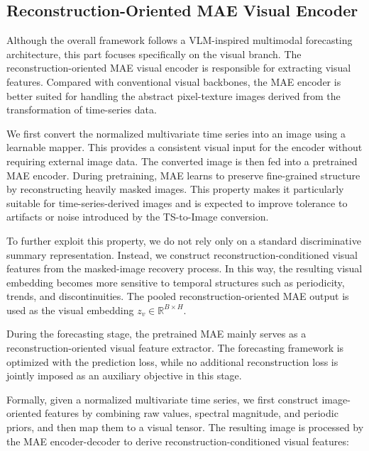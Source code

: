 \subsection{Reconstruction-Oriented MAE Visual Encoder}

Although the overall framework follows a VLM-inspired multimodal forecasting architecture, this part focuses specifically on the visual branch. The reconstruction-oriented MAE visual encoder is responsible for extracting visual features. Compared with conventional visual backbones, the MAE encoder is better suited for handling the abstract pixel-texture images derived from the transformation of time-series data.

We first convert the normalized multivariate time series into an image using a learnable mapper. This provides a consistent visual input for the encoder without requiring external image data. The converted image is then fed into a pretrained MAE encoder. During pretraining, MAE learns to preserve fine-grained structure by reconstructing heavily masked images. This property makes it particularly suitable for time-series-derived images and is expected to improve tolerance to artifacts or noise introduced by the TS-to-Image conversion.

To further exploit this property, we do not rely only on a standard discriminative summary representation. Instead, we construct reconstruction-conditioned visual features from the masked-image recovery process. In this way, the resulting visual embedding becomes more sensitive to temporal structures such as periodicity, trends, and discontinuities. The pooled reconstruction-oriented MAE output is used as the visual embedding $z_v \in \mathbb{R}^{B \times H}$.

During the forecasting stage, the pretrained MAE mainly serves as a reconstruction-oriented visual feature extractor. The forecasting framework is optimized with the prediction loss, while no additional reconstruction loss is jointly imposed as an auxiliary objective in this stage.

Formally, given a normalized multivariate time series, we first construct image-oriented features by combining raw values, spectral magnitude, and periodic priors, and then map them to a visual tensor. The resulting image is processed by the MAE encoder-decoder to derive reconstruction-conditioned visual features:

